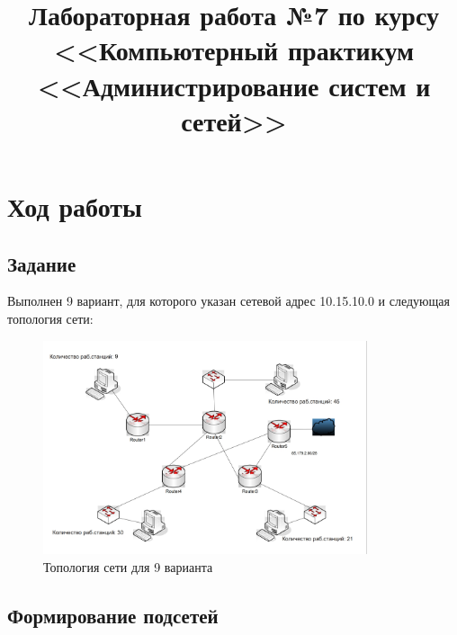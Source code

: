 \documentclass[a4paper]{article}
\title{
  Лабораторная работа №7 по курсу \\
  <<Компьютерный практикум <<Администрирование систем и сетей>>  
}
\begin{document}
  \templatedtitlepage
  
  \toc
  \section{Ход работы}

  \subsection{Задание}

  Выполнен 9 вариант, для которого указан сетевой адрес 10.15.10.0 и следующая
  топология сети:

  \begin{figure}[H]
    \centering
    \includegraphics[width=0.85\textwidth]{07}
    \caption{Топология сети для 9 варианта}
    \label{img:topology}
  \end{figure}

  \newpage
  \subsection{Формирование подсетей}
\end{document}
